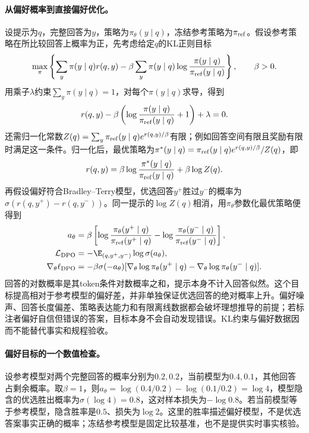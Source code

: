 \paragraph{从偏好概率到直接偏好优化。}
设提示为$q$，完整回答为$y$，策略为$\pi_\theta(y\mid q)$，冻结参考策略为$\pi_{\rm ref}$。假设参考策略在所比较回答上概率为正，先考虑给定$q$的KL正则目标
\begin{equation}
 \max_\pi\left\{\sum_y\pi(y\mid q)r(q,y)
 -\beta\sum_y\pi(y\mid q)\log\frac{\pi(y\mid q)}{\pi_{\rm ref}(y\mid q)}\right\},\qquad\beta>0.
\end{equation}
用乘子$\lambda$约束$\sum_y\pi(y\mid q)=1$，对每个$\pi(y\mid q)$求导，得到
\begin{equation}
 r(q,y)-\beta\left(\log\frac{\pi(y\mid q)}{\pi_{\rm ref}(y\mid q)}+1\right)+\lambda=0.
\end{equation}
还需归一化常数$Z(q)=\sum_y\pi_{\rm ref}(y\mid q)e^{r(q,y)/\beta}$有限；例如回答空间有限且奖励有限时满足这一条件。归一化后，最优策略为$\pi^*(y\mid q)=\pi_{\rm ref}(y\mid q)e^{r(q,y)/\beta}/Z(q)$，即
\begin{equation}
 r(q,y)=\beta\log\frac{\pi^*(y\mid q)}{\pi_{\rm ref}(y\mid q)}+\beta\log Z(q).
\end{equation}
再假设偏好符合Bradley--Terry模型，优选回答$y^+$胜过$y^-$的概率为$\sigma(r(q,y^+)-r(q,y^-))$。同一提示的$\log Z(q)$相消，用$\pi_\theta$参数化最优策略便得到
\begin{align}
 a_\theta&=\beta\left[\log\frac{\pi_\theta(y^+\mid q)}{\pi_{\rm ref}(y^+\mid q)}-
 \log\frac{\pi_\theta(y^-\mid q)}{\pi_{\rm ref}(y^-\mid q)}\right],\\
 \mathcal L_{\rm DPO}&=-\E_{(q,y^+,y^-)}\log\sigma(a_\theta),\\
 \nabla_\theta\ell_{\rm DPO}&=-\beta\sigma(-a_\theta)
 [\nabla_\theta\log\pi_\theta(y^+\mid q)-\nabla_\theta\log\pi_\theta(y^-\mid q)].
\end{align}
回答的对数概率是其token条件对数概率之和，提示本身不计入回答似然。这个目标提高相对于参考模型的偏好差，并非单独保证优选回答的绝对概率上升。偏好噪声、回答长度偏差、策略表达能力和有限离线数据都会破坏理想推导的前提；若标注者偏好自信但错误的答案，目标本身不会自动发现错误。KL约束与偏好数据因而不能替代事实和规程验收。

\paragraph{偏好目标的一个数值检查。}
设参考模型对两个完整回答的概率分别为$0.2,0.2$，当前模型为$0.4,0.1$，其他回答占剩余概率。取$\beta=1$，则$a_\theta=\log(0.4/0.2)-\log(0.1/0.2)=\log4$，模型隐含的优选胜出概率为$\sigma(\log4)=0.8$，这对样本损失为$-\log0.8$。若当前模型等于参考模型，隐含胜率是$0.5$、损失为$\log2$。这里的胜率描述偏好模型，不是优选答案事实正确的概率；冻结参考模型是固定比较基准，也不是提供实时事实核验。

